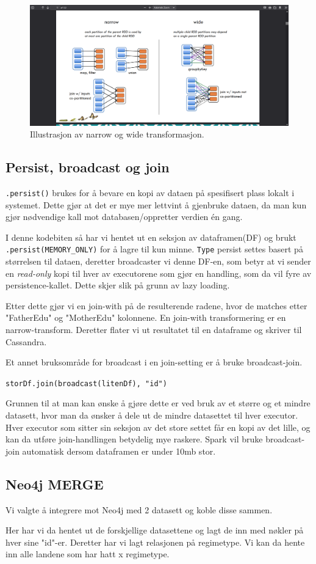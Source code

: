 \begin{figure}[H]
    \centering
    \includegraphics[scale=0.3]{images/transformActionPic.png}
    \caption{Illustrasjon av narrow og wide transformasjon.}
\end{figure}

\subsection{Persist, broadcast og join}
\lstinline{.persist()} brukes for å bevare en kopi av dataen på spesifisert plass lokalt i systemet. Dette gjør at det er mye mer lettvint å gjenbruke dataen, da man kun gjør nødvendige kall mot databasen/oppretter verdien én gang.


I denne kodebiten så har vi hentet ut en seksjon av dataframen(DF) og brukt \lstinline{.persist(MEMORY_ONLY)} for å lagre til kun minne. \lstinline{Type} persist settes basert på størrelsen til dataen, deretter broadcaster vi denne DF-en, som betyr at vi sender en \textit{read-only} kopi til hver av executorene som gjør en handling, som da vil fyre av persistence-kallet. Dette skjer slik på grunn av lazy loading.

Etter dette gjør vi en join-with på de resulterende radene, hvor de matches etter "FatherEdu" og "MotherEdu" kolonnene. En join-with transformering er en narrow-transform. Deretter flater vi ut resultatet til en dataframe og skriver til Cassandra.

Et annet bruksområde for broadcast i en join-setting er å bruke broadcast-join.

\lstinline {storDf.join(broadcast(litenDf), "id")}

Grunnen til at man kan ønske å gjøre dette er ved bruk av et større og et mindre datasett, hvor man da ønsker å dele ut de mindre datasettet til hver executor. Hver executor som sitter sin seksjon av det store settet får en kopi av det lille, og kan da utføre join-handlingen betydelig mye raskere. Spark vil bruke broadcast-join automatisk dersom dataframen er under 10mb stor.

\subsection{Neo4j MERGE}
Vi valgte å integrere mot Neo4j med 2 datasett og koble disse sammen.

Her har vi da hentet ut de forskjellige datasettene og lagt de inn med nøkler på hver sine "id"-er. Deretter har vi lagt relasjonen på regimetype. Vi kan da hente inn alle landene som har hatt x regimetype.